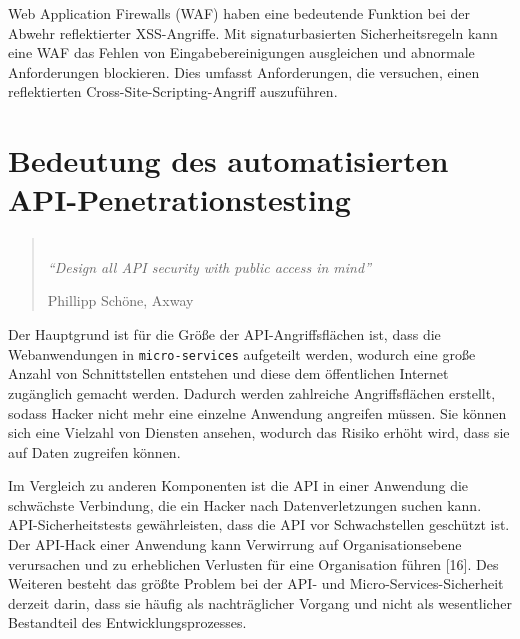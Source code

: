Web Application Firewalls (WAF) haben eine bedeutende Funktion bei der Abwehr reflektierter XSS-Angriffe. Mit signaturbasierten Sicherheitsregeln kann eine WAF das Fehlen von Eingabebereinigungen ausgleichen und abnormale Anforderungen blockieren. Dies umfasst Anforderungen, die versuchen, einen reflektierten Cross-Site-Scripting-Angriff auszuführen\cite{xssreflected16}.

\newpage

\section{Bedeutung des automatisierten API-Penetrationstesting}

\begin{quote}
	\emph{\\
		"`Design all API security with public access in mind"'}
	\begin{flushright}
		Phillipp Schöne, Axway
	\end{flushright}
\end{quote}

Der Hauptgrund ist für die Größe der API-Angriffsflächen ist, dass die Webanwendungen in \texttt{micro-services} aufgeteilt werden, wodurch eine große Anzahl von Schnittstellen entstehen und diese dem öffentlichen Internet zugänglich gemacht werden. Dadurch werden zahlreiche Angriffsflächen erstellt, sodass Hacker nicht mehr eine einzelne Anwendung angreifen müssen. Sie können sich eine Vielzahl von Diensten ansehen, wodurch das Risiko erhöht wird, dass sie auf Daten zugreifen können\cite{mswv17}. 

Im Vergleich zu anderen Komponenten ist die API in einer Anwendung die schwächste Verbindung, die ein Hacker nach Datenverletzungen suchen kann. API-Sicherheitstests gewährleisten, dass die API vor Schwachstellen geschützt ist. Der API-Hack einer Anwendung kann Verwirrung auf Organisationsebene verursachen und zu erheblichen Verlusten für eine Organisation führen [16]. Des Weiteren besteht das größte Problem bei der API- und Micro-Services-Sicherheit derzeit darin, dass sie häufig als nachträglicher Vorgang und nicht als wesentlicher Bestandteil des Entwicklungsprozesses\cite{anthonyart18}.

